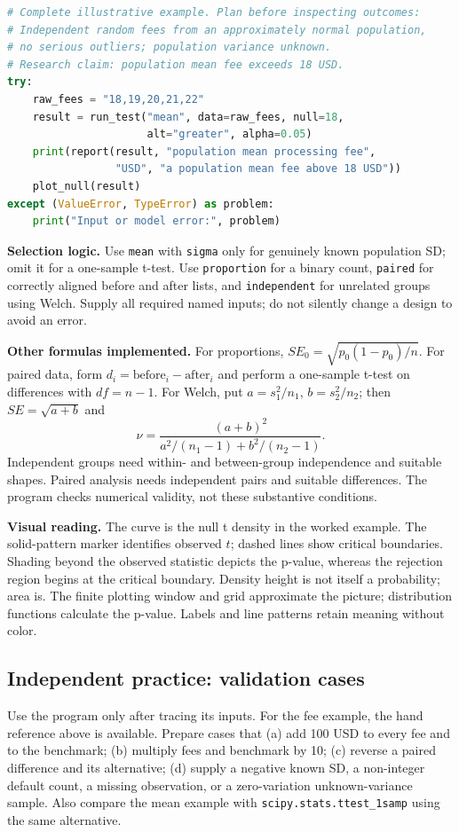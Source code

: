 \begin{lstlisting}[language=Python,basicstyle=\ttfamily\small,breaklines=true,columns=fullflexible,keepspaces=true]
# Complete illustrative example. Plan before inspecting outcomes:
# Independent random fees from an approximately normal population,
# no serious outliers; population variance unknown.
# Research claim: population mean fee exceeds 18 USD.
try:
    raw_fees = "18,19,20,21,22"
    result = run_test("mean", data=raw_fees, null=18,
                      alt="greater", alpha=0.05)
    print(report(result, "population mean processing fee",
                 "USD", "a population mean fee above 18 USD"))
    plot_null(result)
except (ValueError, TypeError) as problem:
    print("Input or model error:", problem)
\end{lstlisting}

\textbf{Selection logic.} Use \texttt{mean} with \texttt{sigma} only for genuinely known population SD; omit it for a one-sample t-test. Use \texttt{proportion} for a binary count, \texttt{paired} for correctly aligned before and after lists, and \texttt{independent} for unrelated groups using Welch. Supply all required named inputs; do not silently change a design to avoid an error.

\textbf{Other formulas implemented.} For proportions, $SE_0=\sqrt{p_0(1-p_0)/n}$. For paired data, form $d_i=\text{before}_i-\text{after}_i$ and perform a one-sample t-test on differences with $df=n-1$. For Welch, put $a=s_1^2/n_1$, $b=s_2^2/n_2$; then $SE=\sqrt{a+b}$ and
\[
\nu=\frac{(a+b)^2}{a^2/(n_1-1)+b^2/(n_2-1)}.
\]
Independent groups need within- and between-group independence and suitable shapes. Paired analysis needs independent pairs and suitable differences. The program checks numerical validity, not these substantive conditions.

\textbf{Visual reading.} The curve is the null t density in the worked example. The solid-pattern marker identifies observed $t$; dashed lines show critical boundaries. Shading beyond the observed statistic depicts the p-value, whereas the rejection region begins at the critical boundary. Density height is not itself a probability; area is. The finite plotting window and grid approximate the picture; distribution functions calculate the p-value. Labels and line patterns retain meaning without color.
\subsection{Independent practice: validation cases}\label{prob:validation}
Use the program only after tracing its inputs. For the fee example, the hand reference above is available. Prepare cases that (a) add 100 USD to every fee and to the benchmark; (b) multiply fees and benchmark by 10; (c) reverse a paired difference and its alternative; (d) supply a negative known SD, a non-integer default count, a missing observation, or a zero-variation unknown-variance sample. Also compare the mean example with \texttt{scipy.stats.ttest\_1samp} using the same alternative.
